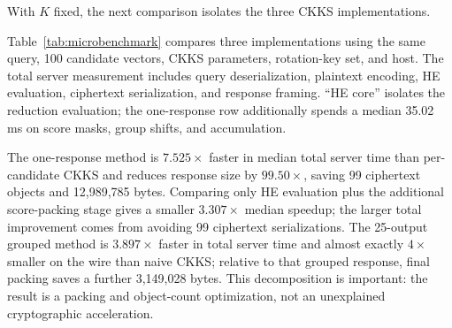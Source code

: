 \documentclass[pdflatex,sn-basic,Numbered]{sn-jnl}
\theoremstyle{plain}
\begin{document}
With $K$ fixed, the next comparison isolates the three CKKS implementations.\label{subsec:kernel-results}

Table~\ref{tab:microbenchmark} compares three implementations using the same query, 100 candidate vectors, CKKS parameters, rotation-key set, and host. The total server measurement includes query deserialization, plaintext encoding, HE evaluation, ciphertext serialization, and response framing. ``HE core'' isolates the reduction evaluation; the one-response row additionally spends a median 35.02 ms on score masks, group shifts, and accumulation.

\begin{table}[t]
\caption{Identical-parameter CKKS microbenchmark at $d'=672$, $K=100$ (20 repetitions after two warmups). Times are milliseconds; response is application bytes.}\label{tab:microbenchmark}
\centering
\small
{}
\end{table}

The one-response method is $7.525\times$ faster in median total server time than per-candidate CKKS and reduces response size by $99.50\times$, saving 99 ciphertext objects and 12,989,785 bytes. Comparing only HE evaluation plus the additional score-packing stage gives a smaller $3.307\times$ median speedup; the larger total improvement comes from avoiding 99 ciphertext serializations. The 25-output grouped method is $3.897\times$ faster in total server time and almost exactly $4\times$ smaller on the wire than naive CKKS; relative to that grouped response, final packing saves a further 3,149,028 bytes. This decomposition is important: the result is a packing and object-count optimization, not an unexplained cryptographic acceleration.
\end{document}
